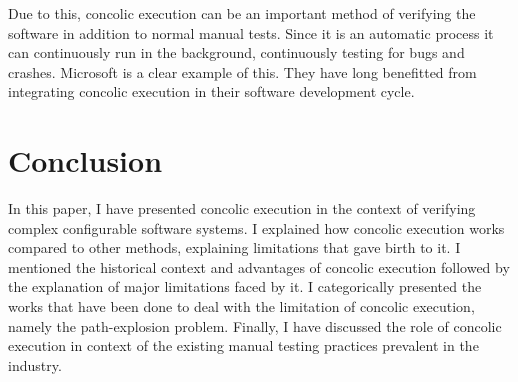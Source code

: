 \documentclass[ runningheads,
               a4paper]{llncs}
\begin{document}
Due to this, concolic execution can be an important method of verifying the software in addition to normal manual tests. Since it is an automatic process it can continuously run in the background, continuously testing for bugs and crashes. Microsoft is a clear example of this. They have long benefitted \cite{godefroid2012sage} from integrating concolic execution in their software development cycle.






\section{Conclusion}
In this paper, I have presented concolic execution in the context of verifying complex configurable software systems. I explained how concolic execution works compared to other methods, explaining limitations that gave birth to it. I mentioned the historical context and advantages of concolic execution followed by the explanation of major limitations faced by it. I categorically presented the works that have been done to deal with the limitation of concolic execution, namely the path-explosion problem. Finally, I have discussed the role of concolic execution in context of the existing manual testing practices prevalent in the industry.












  
\end{document}
